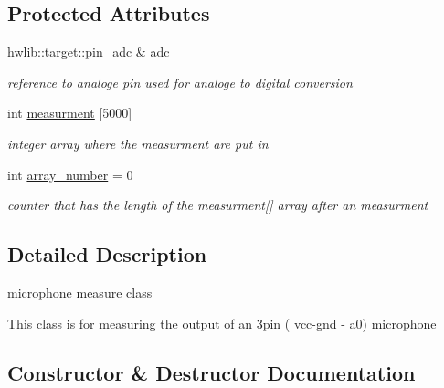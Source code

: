 \subsection*{Protected Attributes}
\begin{DoxyCompactItemize}
\item 
hwlib\+::target\+::pin\+\_\+adc \& \hyperlink{classsound_a1b4c38e994daa1b3e9006852d3d9242a}{adc}\hypertarget{classsound_a1b4c38e994daa1b3e9006852d3d9242a}{}\label{classsound_a1b4c38e994daa1b3e9006852d3d9242a}

\begin{DoxyCompactList}\small\item\em reference to analoge pin used for analoge to digital conversion \end{DoxyCompactList}\item 
int \hyperlink{classsound_a33d9a2a358635cf66a2b08fca23f5a8c}{measurment} \mbox{[}5000\mbox{]}\hypertarget{classsound_a33d9a2a358635cf66a2b08fca23f5a8c}{}\label{classsound_a33d9a2a358635cf66a2b08fca23f5a8c}

\begin{DoxyCompactList}\small\item\em integer array where the measurment are put in \end{DoxyCompactList}\item 
int \hyperlink{classsound_a5b5e59c09240ddf40827f7c12fafbbad}{array\+\_\+number} = 0\hypertarget{classsound_a5b5e59c09240ddf40827f7c12fafbbad}{}\label{classsound_a5b5e59c09240ddf40827f7c12fafbbad}

\begin{DoxyCompactList}\small\item\em counter that has the length of the measurment\mbox{[}\mbox{]} array after an measurment \end{DoxyCompactList}\end{DoxyCompactItemize}


\subsection{Detailed Description}
microphone measure class 

This class is for measuring the output of an 3pin ( vcc-\/gnd -\/ a0) microphone 

\subsection{Constructor \& Destructor Documentation}
